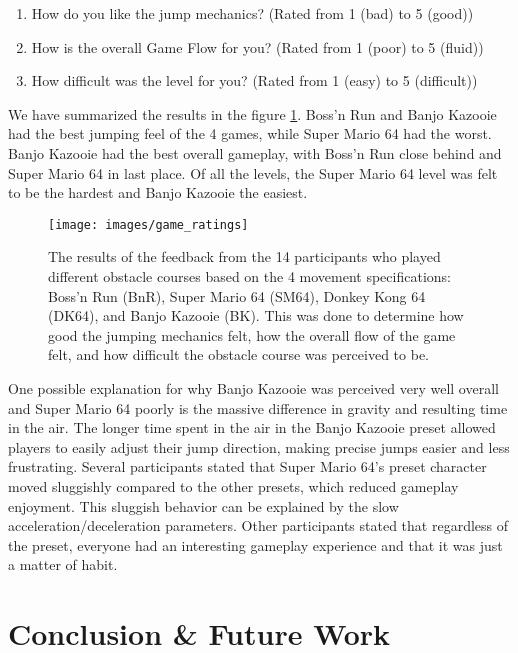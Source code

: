 \documentclass[conference]{IEEEtran}
\begin{document}
\begin{enumerate}
    \item How do you like the jump mechanics? (Rated from 1 (bad) to 5 (good))
    \item How is the overall Game Flow for you? (Rated from 1 (poor) to 5 (fluid))
    \item How difficult was the level for you? (Rated from 1 (easy) to 5 (difficult))
\end{enumerate}

We have summarized the results in the figure \ref{fig:eval}.
Boss'n Run and Banjo Kazooie had the best jumping feel of the 4 games, while Super Mario 64 had the worst.
Banjo Kazooie had the best overall gameplay, with Boss'n Run close behind and Super Mario 64 in last place.
Of all the levels, the Super Mario 64 level was felt to be the hardest and Banjo Kazooie the easiest.

\begin{figure}[!ht]
    \caption{The results of the feedback from the 14 participants who played different obstacle courses based on the 4 movement specifications: Boss'n Run (BnR), Super Mario 64 (SM64), Donkey Kong 64 (DK64), and Banjo Kazooie (BK). This was done to determine how good the jumping mechanics felt, how the overall flow of the game felt, and how difficult the obstacle course was perceived to be.}
    \centering
    \texttt{[image: images/game\_ratings]}
    \label{fig:eval}
\end{figure}


One possible explanation for why Banjo Kazooie was perceived very well overall and Super Mario 64 poorly is the massive difference in gravity and resulting time in the air.
The longer time spent in the air in the Banjo Kazooie preset allowed players to easily adjust their jump direction, making precise jumps easier and less frustrating.
Several participants stated that Super Mario 64's preset character moved sluggishly compared to the other presets, which reduced gameplay enjoyment.
This sluggish behavior can be explained by the slow acceleration/deceleration parameters.
Other participants stated that regardless of the preset, everyone had an interesting gameplay experience and that it was just a matter of habit.


\section{Conclusion \& Future Work}
\label{Sec:ConcFuture}
\end{document}
